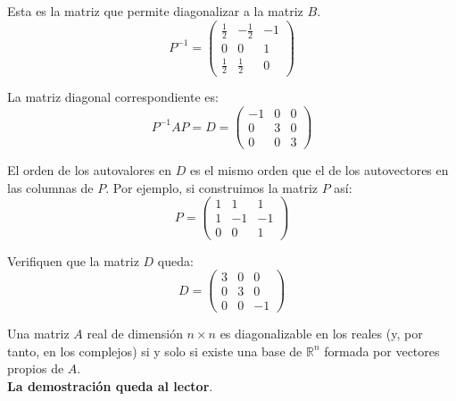 \begin{example}
Esta es la matriz que permite diagonalizar a la matriz \( B \).
\[ P^{-1} = \begin{pmatrix}
\frac{1}{2} & -{\frac{1}{2}} & -1 \\
0 & 0 & 1\\
\frac{1}{2} & \frac{1}{2} & 0
\end{pmatrix} \]

La matriz diagonal correspondiente es:
\[ P^{-1} A P = D = \begin{pmatrix}
-1 & 0 & 0 \\
0 & 3 & 0 \\
0 & 0 & 3
\end{pmatrix} \]

El orden de los autovalores en \( D \) es el mismo orden que el de los autovectores en las columnas de \( P \). Por ejemplo, si construimos la matriz \( P \) así:
\[ P = \begin{pmatrix}
1 & 1 & 1 \\
1 & -1 & -1 \\
0 & 0 & 1
\end{pmatrix} \]

Verifiquen que la matriz \( D \) queda:
\[ D = \begin{pmatrix}
3 & 0 & 0 \\
0 & 3 & 0 \\
0 & 0 & -1
\end{pmatrix} \]
   
\end{example}
\begin{tcolorbox}[colback=white!5!white,colframe=red!50!red,title=Teorema]
 Una matriz $A$ real de dimensión $n \times n$  es diagonalizable en los reales (y, por tanto, en los complejos) si y solo si existe una base de $\mathbb{R}^n$ formada por vectores propios de $A$.\\
 \textbf{ La demostración queda al lector}.
\end{tcolorbox}
